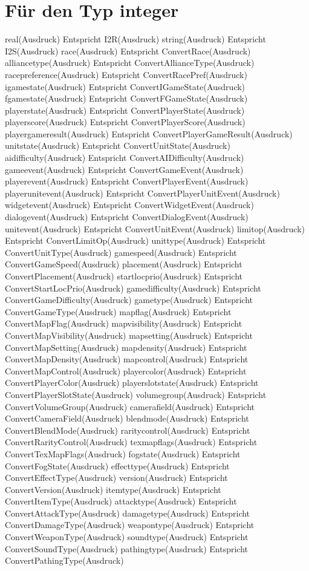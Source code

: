 \section{Für den Typ integer}
real(Ausdruck)						Entspricht I2R(Ausdruck)
string(Ausdruck)					Entspricht I2S(Ausdruck)
race(Ausdruck)						Entspricht ConvertRace(Ausdruck)
alliancetype(Ausdruck)					Entspricht ConvertAllianceType(Ausdruck)
racepreference(Ausdruck)				Entspricht ConvertRacePref(Ausdruck)
igamestate(Ausdruck)					Entspricht ConvertIGameState(Ausdruck)
fgamestate(Ausdruck)					Entspricht ConvertFGameState(Ausdruck)
playerstate(Ausdruck)					Entspricht ConvertPlayerState(Ausdruck)
playerscore(Ausdruck)					Entspricht ConvertPlayerScore(Ausdruck)
playergameresult(Ausdruck)				Entspricht ConvertPlayerGameResult(Ausdruck)
unitstate(Ausdruck)					Entspricht ConvertUnitState(Ausdruck)
aidifficulty(Ausdruck)					Entspricht ConvertAIDifficulty(Ausdruck)
gameevent(Ausdruck)					Entspricht ConvertGameEvent(Ausdruck)
playerevent(Ausdruck)					Entspricht ConvertPlayerEvent(Ausdruck)
playerunitevent(Ausdruck)				Entspricht ConvertPlayerUnitEvent(Ausdruck)
widgetevent(Ausdruck)					Entspricht ConvertWidgetEvent(Ausdruck)
dialogevent(Ausdruck)					Entspricht ConvertDialogEvent(Ausdruck)
unitevent(Ausdruck)					Entspricht ConvertUnitEvent(Ausdruck)
limitop(Ausdruck)					Entspricht ConvertLimitOp(Ausdruck)
unittype(Ausdruck)					Entspricht ConvertUnitType(Ausdruck)
gamespeed(Ausdruck)					Entspricht ConvertGameSpeed(Ausdruck)
placement(Ausdruck)					Entspricht ConvertPlacement(Ausdruck)
startlocprio(Ausdruck)					Entspricht ConvertStartLocPrio(Ausdruck)
gamedifficulty(Ausdruck)				Entspricht ConvertGameDifficulty(Ausdruck)
gametype(Ausdruck)					Entspricht ConvertGameType(Ausdruck)
mapflag(Ausdruck)					Entspricht ConvertMapFlag(Ausdruck)
mapvisibility(Ausdruck)					Entspricht ConvertMapVisibility(Ausdruck)
mapsetting(Ausdruck)					Entspricht ConvertMapSetting(Ausdruck)
mapdensity(Ausdruck)					Entspricht ConvertMapDensity(Ausdruck)
mapcontrol(Ausdruck)					Entspricht ConvertMapControl(Ausdruck)
playercolor(Ausdruck)					Entspricht ConvertPlayerColor(Ausdruck)
playerslotstate(Ausdruck)				Entspricht ConvertPlayerSlotState(Ausdruck)
volumegroup(Ausdruck)					Entspricht ConvertVolumeGroup(Ausdruck)
camerafield(Ausdruck)					Entspricht ConvertCameraField(Ausdruck)
blendmode(Ausdruck)					Entspricht ConvertBlendMode(Ausdruck)
raritycontrol(Ausdruck)					Entspricht ConvertRarityControl(Ausdruck)
texmapflags(Ausdruck)					Entspricht ConvertTexMapFlags(Ausdruck)
fogstate(Ausdruck)					Entspricht ConvertFogState(Ausdruck)
effecttype(Ausdruck)					Entspricht ConvertEffectType(Ausdruck)
version(Ausdruck)					Entspricht ConvertVersion(Ausdruck)
itemtype(Ausdruck)					Entspricht ConvertItemType(Ausdruck)
attacktype(Ausdruck)					Entspricht ConvertAttackType(Ausdruck)
damagetype(Ausdruck)					Entspricht ConvertDamageType(Ausdruck)
weapontype(Ausdruck)					Entspricht ConvertWeaponType(Ausdruck)
soundtype(Ausdruck)					Entspricht ConvertSoundType(Ausdruck)
pathingtype(Ausdruck)					Entspricht ConvertPathingType(Ausdruck)

